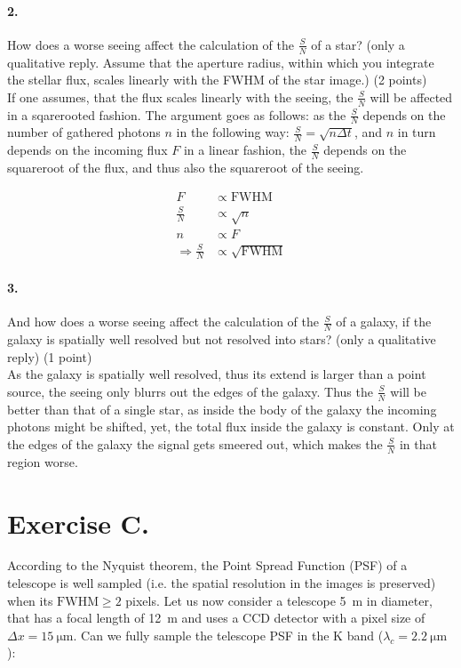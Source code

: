\documentclass[11pt,a4paper,twoside]{article}
\newcommand{\SNR}{\ensuremath{\frac{S}{N}} }
\begin{document}
\paragraph{2.} How does a worse seeing affect the calculation of the \SNR of a
star? (only a qualitative reply. Assume that the aperture radius, within which
you integrate the stellar flux, scales linearly with the FWHM of the star
image.) (2 points) \\

If one assumes, that the flux scales linearly with the seeing, the \SNR will
be affected in a sqarerooted fashion. The argument goes as follows:
as the \SNR depends on the number of gathered photons $n$ in the following way:
$\SNR = \sqrt{n\Delta t}$, and $n$ in turn depends on the incoming flux $F$ in 
a linear fashion, the \SNR depends on the squareroot of the flux,  and thus
also the squareroot of the seeing.

\begin{align}
F       &\propto \mathrm{FWHM}    \\
\SNR    &\propto \sqrt{n}      \\
n       &\propto F              \\
\Rightarrow 
\SNR    &\propto \sqrt{\mathrm{FWHM}}
\end{align}

\paragraph{3.} And how does a worse seeing affect the calculation of the \SNR
of a galaxy, if the galaxy is spatially well resolved but not resolved into
stars? (only a qualitative reply) (1 point) \\

As the galaxy is spatially well resolved, thus its extend is larger than a
point source, the seeing only blurrs out the edges of the galaxy. Thus the
\SNR will be better than that of a single star, as inside the body of the galaxy
the incoming photons might be shifted, yet, the total flux inside the galaxy is
constant. Only at the edges of the galaxy the signal gets smeered out, which
makes the \SNR in that region worse.


\section*{Exercise C.}
According to the Nyquist theorem, the Point Spread Function (PSF) of a
telescope is well sampled (i.e. the spatial resolution in the images is
preserved) when its $\mathrm{FWHM} \geq 2$ pixels. Let us now consider a
telescope \SI{5}{\meter} in diameter, that has a focal length of
\SI{12}{\meter} and uses a CCD detector with a pixel size of $\Delta x =
\SI{15}{\micro\meter}$. Can we fully sample the telescope PSF in the K band
($\lambda_c = \SI{2.2}{\micro\meter}$):
\end{document}
